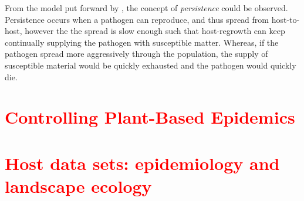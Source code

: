From the model put forward by \cite{park2001invasion}, the concept of \textit{persistence} could be observed. Persistence occurs when a pathogen can reproduce, and thus spread from host-to-host, however the the spread is slow enough such that host-regrowth can keep continually supplying the pathogen with susceptible matter. Whereas, if the pathogen spread more aggressively through the population, the supply of susceptible material would be quickly exhausted and the pathogen would quickly die.


\section{\textcolor{red}{Controlling Plant-Based Epidemics}}

\blindtext



\section{\textcolor{red}{Host data sets: epidemiology and landscape ecology}}

